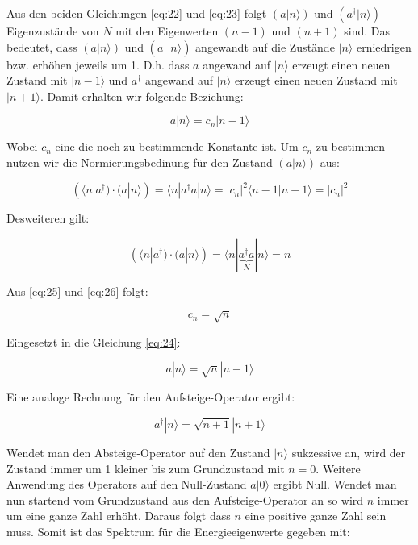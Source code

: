 Aus den beiden Gleichungen \eqref{eq:22} und \eqref{eq:23} folgt  \((a|n\rangle) \) und \((a^\dagger|n\rangle)\) Eigenzustände von \(N\) mit den Eigenwerten \((n-1)\) und  \((n+ 1)\) sind. Das bedeutet, dass \((a|n\rangle) \) und \((a^\dagger|n\rangle)\) angewandt auf die Zustände \(|n\rangle \) erniedrigen bzw. erhöhen jeweils um 1. D.h. dass \(a\) angewand auf \(|n\rangle \) erzeugt einen neuen Zustand mit \(|n-1\rangle \) und \(a^\dagger\) angewand auf \(|n\rangle \) erzeugt einen neuen Zustand mit \(|n+1\rangle \). Damit erhalten wir folgende Beziehung:

\begin{equation}
  \label{eq:24}
  a|n\rangle = c_{n}|n-1\rangle 
\end{equation}

Wobei \(c_n\) eine die noch zu bestimmende Konstante ist. Um \(c_n\) zu bestimmen nutzen wir die Normierungsbedinung für den Zustand \((a|n\rangle )\) aus:

\begin{equation}
  \label{eq:25}
  (\langle n| a^\dagger )\cdot(a|n\rangle ) = \langle n| a^\dagger a | n\rangle  = |c_n|^2 \langle n-1|n-1\rangle  = |c_n|^2
\end{equation}

Desweiteren gilt:

\begin{equation}
  \label{eq:26}
   (\langle n| a^\dagger )\cdot(a|n\rangle ) = \langle n| \underbrace{a^\dagger a}_{N} | n\rangle  = n
\end{equation}

Aus  \eqref{eq:25} und \eqref{eq:26} folgt:

\begin{equation}
  \label{eq:27}
  c_n = \sqrt{n}
\end{equation}

Eingesetzt in die Gleichung \eqref{eq:24}:

\begin{equation}
  \label{eq:28}
   \boxed{ a|n\rangle = \sqrt{n}|n-1\rangle }
\end{equation}

Eine analoge Rechnung für den Aufsteige-Operator ergibt:

\begin{equation}
  \label{eq:29}
  \boxed{ a^\dagger|n\rangle = \sqrt{n+1}|n+1\rangle }
\end{equation}

Wendet man den Absteige-Operator auf den Zustand \(|n\rangle \) sukzessive an, wird der Zustand immer um 1 kleiner bis zum Grundzustand mit \(n=0\). Weitere Anwendung des Operators auf den Null-Zustand \(a|0\rangle \) ergibt Null. Wendet man nun startend vom Grundzustand aus den Aufsteige-Operator an so wird \(n\) immer um eine ganze Zahl erhöht. Daraus folgt dass \(n\) eine positive ganze Zahl sein muss. Somit ist das Spektrum für die Energieeigenwerte gegeben mit:

